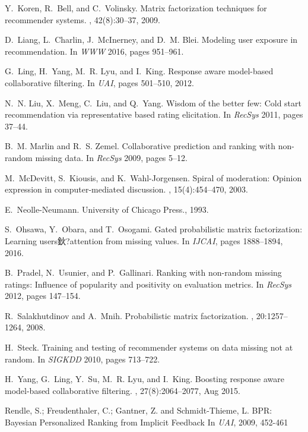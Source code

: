 \documentclass[sigconf]{acmart}
\begin{document}
\begin{thebibliography}{10}
Y.~Koren, R.~Bell, and C.~Volinsky.
\newblock Matrix factorization techniques for recommender systems.
, 42(8):30--37, 2009.

D.~Liang, L.~Charlin, J.~McInerney, and D.~M. Blei.
\newblock Modeling user exposure in recommendation.
\newblock In {\em WWW } 2016, pages 951--961.

G.~Ling, H.~Yang, M.~R. Lyu, and I.~King.
\newblock Response aware model-based collaborative filtering.
\newblock In {\em UAI}, pages 501--510, 2012.

N.~N. Liu, X.~Meng, C.~Liu, and Q.~Yang.
\newblock Wisdom of the better few: Cold start recommendation via
  representative based rating elicitation.
\newblock In {\em  RecSys } 2011, pages 37--44.

B.~M. Marlin and R.~S. Zemel.
\newblock Collaborative prediction and ranking with non-random missing data.
\newblock In {\em RecSys}  2009, pages 5--12.

M.~McDevitt, S.~Kiousis, and K.~Wahl-Jorgensen.
\newblock Spiral of moderation: Opinion expression in computer-mediated
  discussion.
,
  15(4):454--470, 2003.

E.~Neolle-Neumann.
\newblock University of Chicago Press., 1993.

S.~Ohsawa, Y.~Obara, and T.~Osogami.
\newblock Gated probabilistic matrix factorization: Learning users鈥?attention
  from missing values.
\newblock In {\em IJCAI}, pages 1888--1894, 2016.

B.~Pradel, N.~Usunier, and P.~Gallinari.
\newblock Ranking with non-random missing ratings: Influence of popularity and
  positivity on evaluation metrics.
\newblock In {\em RecSys } 2012, pages 147--154.

R.~Salakhutdinov and A.~Mnih.
\newblock Probabilistic matrix factorization.
,
  20:1257--1264, 2008.

H.~Steck.
\newblock Training and testing of recommender systems on data missing not at
  random.
\newblock In {\em SIGKDD } 2010, pages 713--722.

H.~Yang, G.~Ling, Y.~Su, M.~R. Lyu, and I.~King.
\newblock Boosting response aware model-based collaborative filtering.
,
  27(8):2064--2077, Aug 2015.
  
 Rendle, S.; Freudenthaler, C.; Gantner, Z. and Schmidt-Thieme, L. 
 \newblock BPR: Bayesian Personalized Ranking from Implicit Feedback 
 \newblock In {\em UAI}, 2009, 452-461

\end{thebibliography}

\end{document}
